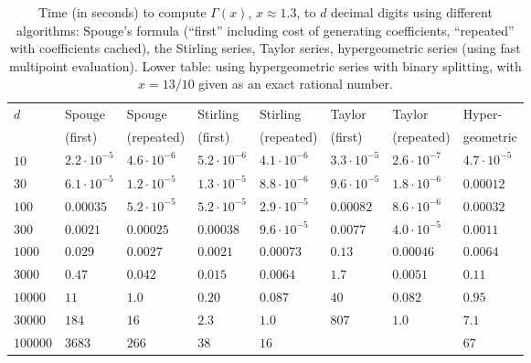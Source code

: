 \documentclass[reqno]{amsart}
\theoremstyle{definition}
\begin{document}
\begin{table}
\setlength{\tabcolsep}{3.1pt}
\renewcommand{\arraystretch}{1.02}
\centering
\caption{Time (in seconds) to compute $\Gamma(x)$, $x \approx 1.3$, to $d$ decimal digits using different algorithms:
Spouge's formula (``first'' including cost of generating coefficients, ``repeated'' with coefficients cached), the Stirling series,
Taylor series,
hypergeometric series (using fast multipoint evaluation). Lower table: using hypergeometric series with binary splitting, with $x = 13/10$ given as an exact rational number.}
\label{tab:maintimings}
\small
\begin{tabular}{l l l l l l l l}
 $d$ & Spouge & Spouge & Stirling & Stirling & Taylor & Taylor & Hyper- \\
     & (first)  & (repeated)  & (first)  & (repeated) & (first) & (repeated) & geometric  \\
 \hline
 $10$ $\phantom{2^{2^2}}$ & $2.2 \cdot 10^{-5}$ & $4.6 \cdot 10^{-6}$ & $5.2 \cdot 10^{-6}$  &  $4.1 \cdot 10^{-6}$   & $3.3 \cdot 10^{-5}$ & $2.6 \cdot 10^{-7}$ &  $4.7 \cdot 10^{-5}$ \\
 $30$ & $6.1 \cdot 10^{-5}$ & $1.2 \cdot 10^{-5}$ &   $1.3 \cdot 10^{-5}$  &  $8.8 \cdot 10^{-6}$                           &  $9.6 \cdot 10^{-5}$ & $1.8 \cdot 10^{-6}$  &  $0.00012$    \\
 $100$ & $0.00035$ & $5.2 \cdot 10^{-5}$ &  $5.2 \cdot 10^{-5}$  &  $2.9 \cdot 10^{-5}$                                 &  $0.00082$ & $8.6 \cdot 10^{-6}$       &  $0.00032$   \\
 $300$ & $0.0021$ & $0.00025$ &  $0.00038$  &  $9.6 \cdot 10^{-5}$                                                      &  $0.0077$ & $4.0 \cdot 10^{-5}$       &  $0.0011$    \\
 $1000$ & $0.029$ & $0.0027$ &  $0.0021$  &  $0.00073$                                                             &  $0.13$ & $0.00046$            &  $0.0064$    \\
 $3000$ & $0.47$ & $0.042$ &  $0.015$   &  $0.0064$               &  $1.7$    &  $0.0051$       &  $0.11$          \\
 $10000$ & $11$ & $1.0$ &  $0.20$   &  $0.087$                   &  $40$ &   $0.082$        &  $0.95$          \\
 $30000$ & $184$ & $16$ &  $2.3$    &  $1.0$                     &  $807$   &    $1.0$        &  $7.1$        \\
 $100000$ & $3683$ & $266$ &  $38$    &  $16$                      &      &            &  $67$        \\

\end{tabular}
\end{table}
\end{document}
